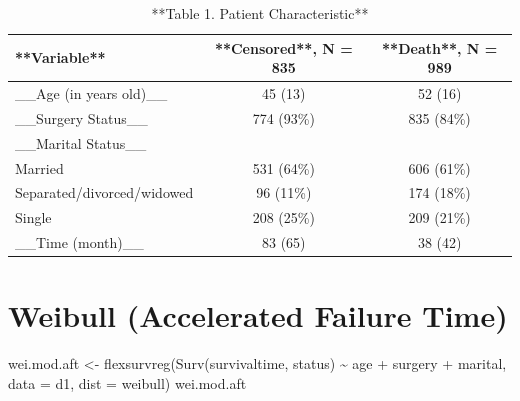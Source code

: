 \documentclass[
  10pt,
]{krantz}
\newenvironment{Shaded}{\begin{snugshade}}{\end{snugshade}}
\newcommand{\AttributeTok}[1]{\textcolor[rgb]{0.77,0.63,0.00}{#1}}
\newcommand{\FunctionTok}[1]{\textcolor[rgb]{0.00,0.00,0.00}{#1}}
\newcommand{\NormalTok}[1]{#1}
\newcommand{\OtherTok}[1]{\textcolor[rgb]{0.56,0.35,0.01}{#1}}
\newcommand{\SpecialCharTok}[1]{\textcolor[rgb]{0.00,0.00,0.00}{#1}}
\newcommand{\StringTok}[1]{\textcolor[rgb]{0.31,0.60,0.02}{#1}}
\begin{document}
\begin{table}

\caption{\label{tab:unnamed-chunk-4}**Table 1. Patient Characteristic**}
\centering
\begin{tabular}[t]{l|c|c}
\hline
**Variable** & **Censored**, N = 835 & **Death**, N = 989\\
\hline
\_\_Age (in years old)\_\_ & 45 (13) & 52 (16)\\
\hline
\_\_Surgery Status\_\_ & 774 (93\%) & 835 (84\%)\\
\hline
\_\_Marital Status\_\_ &  & \\
\hline
Married & 531 (64\%) & 606 (61\%)\\
\hline
Separated/divorced/widowed & 96 (11\%) & 174 (18\%)\\
\hline
Single & 208 (25\%) & 209 (21\%)\\
\hline
\_\_Time (month)\_\_ & 83 (65) & 38 (42)\\
\hline
\end{tabular}
\end{table}

\hypertarget{weibull-accelerated-failure-time}{%
\section{\texorpdfstring{Weibull (Accelerated Failure Time)}{Weibull (Accelerated Failure Time)}}\label{weibull-accelerated-failure-time}}

\begin{Shaded}
\begin{Highlighting}[]
\NormalTok{wei.mod.aft }\OtherTok{\textless{}{-}} \FunctionTok{flexsurvreg}\NormalTok{(}\FunctionTok{Surv}\NormalTok{(survivaltime, status) }\SpecialCharTok{\textasciitilde{}}\NormalTok{ age }\SpecialCharTok{+}\NormalTok{ surgery }\SpecialCharTok{+}\NormalTok{ marital, }
                           \AttributeTok{data =}\NormalTok{ d1, }\AttributeTok{dist =} \StringTok{\textquotesingle{}weibull\textquotesingle{}}\NormalTok{)}
\NormalTok{wei.mod.aft}
\end{Highlighting}
\end{Shaded}
\end{document}
